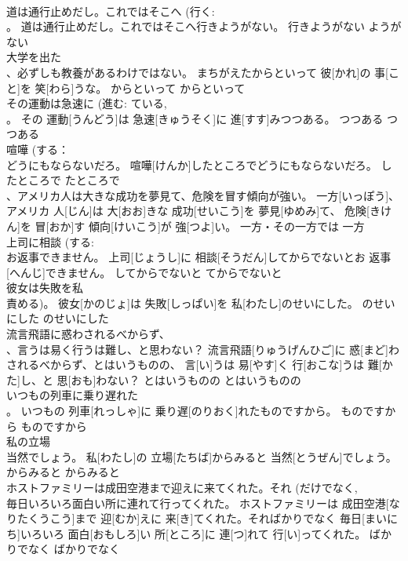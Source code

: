 \documentclass[8pt]{extreport}
\begin{document}
\begin{CJK}{UTF8}{min}
\\	道は通行止めだし。これではそこへ (行く: 
\\	。	道は通行止めだし。これではそこへ行きようがない。	行きようがない	ようがない	
\\	大学を出た 
\\	、必ずしも教養があるわけではない。	まちがえたからといって 彼[かれ]の 事[こと]を 笑[わら]うな。	からといって	からといって	
\\	その運動は急速に (進む: ている, 
\\	。	その 運動[うんどう]は 急速[きゅうそく]に 進[すす]みつつある。	つつある	つつある	
\\	喧嘩 (する： 
\\	どうにもならないだろ。	喧嘩[けんか]したところでどうにもならないだろ。	したところで	たところで	
\\	、アメリカ人は大きな成功を夢見て、危険を冒す傾向が強い。	一方[いっぽう]、アメリカ 人[じん]は 大[おお]きな 成功[せいこう]を 夢見[ゆめみ]て、 危険[きけん]を 冒[おか]す 傾向[けいこう]が 強[つよ]い。	一方・その一方では	一方	
\\	上司に相談 (する: 
\\	お返事できません。	上司[じょうし]に 相談[そうだん]してからでないとお 返事[へんじ]できません。	してからでないと	てからでないと	
\\	彼女は失敗を私
\\	責める)。	彼女[かのじょ]は 失敗[しっぱい]を 私[わたし]のせいにした。	のせいにした	のせいにした	
\\	流言飛語に惑わされるべからず、
\\	、言うは易く行うは難し、と思わない？	流言飛語[りゅうげんひご]に 惑[まど]わされるべからず、とはいうものの、 言[い]うは 易[やす]く 行[おこな]うは 難[かた]し、と 思[おも]わない？	とはいうものの	とはいうものの	
\\	いつもの列車に乗り遅れた 
\\	。	いつもの 列車[れっしゃ]に 乗り遅[のりおく]れたものですから。	ものですから	ものですから	
\\	私の立場 
\\	当然でしょう。	私[わたし]の 立場[たちば]からみると 当然[とうぜん]でしょう。	からみると	からみると	
\\	ホストファミリーは成田空港まで迎えに来てくれた。それ (だけでなく, 
\\	毎日いろいろ面白い所に連れて行ってくれた。	ホストファミリーは 成田空港[なりたくうこう]まで 迎[むか]えに 来[き]てくれた。そればかりでなく 毎日[まいにち]いろいろ 面白[おもしろ]い 所[ところ]に 連[つ]れて 行[い]ってくれた。	ばかりでなく	ばかりでなく	

\end{CJK}
\end{document}
